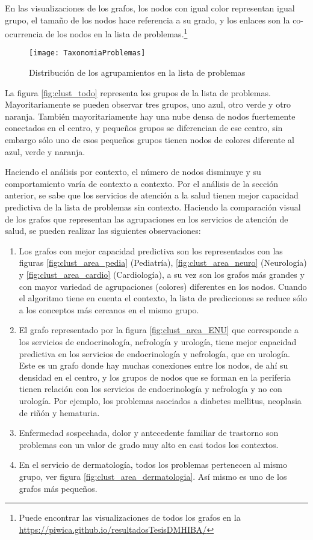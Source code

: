 En las visualizaciones de los grafos, los nodos con igual color representan igual grupo, el tamaño de los nodos hace referencia a su grado, y los enlaces son la co-ocurrencia de los nodos en la lista de problemas.\footnote{Puede encontrar las visualizaciones de todos los grafos en la \url{https://piwica.github.io/resultadosTesisDMHIBA/}}

\begin{figure}[ht]
\caption{Distribución de los agrupamientos en la lista de problemas}
\label{fig:taxonomiaProblemas}
\centering
\texttt{[image: TaxonomiaProblemas]}
\end{figure}

La figura \ref{fig:clust_todo} representa los grupos de la lista de problemas. Mayoritariamente se pueden observar tres grupos, uno azul, otro verde y otro naranja. También mayoritariamente hay una nube densa de nodos fuertemente conectados en el centro, y pequeños grupos se diferencian de ese centro, sin embargo sólo uno de esos pequeños grupos tienen nodos de colores diferente al azul, verde y naranja.

Haciendo el análisis por contexto, el número de nodos disminuye y su comportamiento varía de contexto a contexto. Por el análisis de la sección anterior, se sabe que los servicios de atención a la salud tienen mejor capacidad predictiva de la lista de problemas sin contexto. Haciendo la comparación visual de los grafos que representan las agrupaciones en los servicios de atención de salud, se pueden realizar las siguientes observaciones:

\begin{enumerate}
\item Los grafos con mejor capacidad predictiva son los representados con las figuras \ref{fig:clust_area_pedia} (Pediatría), \ref{fig:clust_area_neuro} (Neurología) y \ref{fig:clust_area_cardio} (Cardiología), a su vez son los grafos más grandes y con mayor variedad de agrupaciones (colores) diferentes en los nodos. Cuando el algoritmo tiene en cuenta el contexto, la lista de predicciones se reduce sólo a los conceptos más cercanos en el mismo grupo.
\item El grafo representado por la figura \ref{fig:clust_area_ENU} que corresponde a los servicios de endocrinología, nefrología y urología, tiene mejor capacidad predictiva en los servicios de endocrinología y nefrología, que en urología. Este es un grafo donde hay muchas conexiones entre los nodos, de ahí su densidad en el centro, y los grupos de nodos que se forman en la periferia tienen relación con los servicios de endocrinología y nefrología y no con urología. Por ejemplo, los problemas asociados a diabetes mellitus, neoplasia de riñón y hematuria.
\item Enfermedad sospechada, dolor y antecedente familiar de trastorno son problemas con un valor de grado muy alto en casi todos los contextos.
\item En el servicio de dermatología, todos los problemas pertenecen al mismo grupo, ver figura \ref{fig:clust_area_dermatologia}. Así mismo es uno de los grafos más pequeños.
\end{enumerate}

